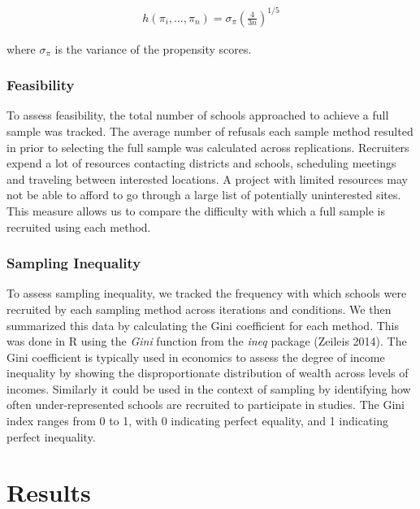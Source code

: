 \documentclass[
  english,
  man,floatsintext]{apa6}
\begin{document}
\begin{align}
h(\pi_i,...,\pi_n) = \sigma_{\pi}(\frac{4}{3n})^{1/5}
\end{align}

where \(\sigma_{\pi}\) is the variance of the propensity scores. 

\hypertarget{feasibility}{%
\subsubsection{Feasibility}\label{feasibility}}

To assess feasibility, the total number of schools approached to achieve a full sample was tracked. The average number of refusals each sample method resulted in prior to selecting the full sample was calculated across replications. Recruiters expend a lot of resources contacting districts and schools, scheduling meetings and traveling between interested locations. A project with limited resources may not be able to afford to go through a large list of potentially uninterested sites. This measure allows us to compare the difficulty with which a full sample is recruited using each method.

\hypertarget{sampling-inequality}{%
\subsubsection{Sampling Inequality}\label{sampling-inequality}}

To assess sampling inequality, we tracked the frequency with which schools were recruited by each sampling method across iterations and conditions. We then summarized this data by calculating the Gini coefficient for each method. This was done in R using the \emph{Gini} function from the \emph{ineq} package (Zeileis 2014). The Gini coefficient is typically used in economics to assess the degree of income inequality by showing the disproportionate distribution of wealth across levels of incomes. Similarly it could be used in the context of sampling by identifying how often under-represented schools are recruited to participate in studies. The Gini index ranges from 0 to 1, with 0 indicating perfect equality, and 1 indicating perfect inequality.

\hypertarget{results}{%
\section{Results}\label{results}}
\end{document}
